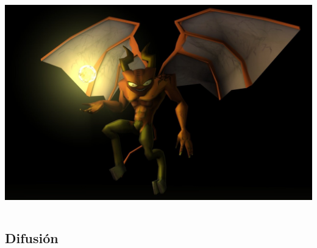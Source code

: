 \documentclass[green]{beamer}
\begin{document}
\begin{frame}
\begin{columns}[t]
    \column{150pt}
	
	\begin{center}
	    \includegraphics[scale=0.11]{img/diablillo.jpg}
	\end{center}
	
    \end{columns} 
\end{frame}

\subsection{Difusión}
\end{document}
